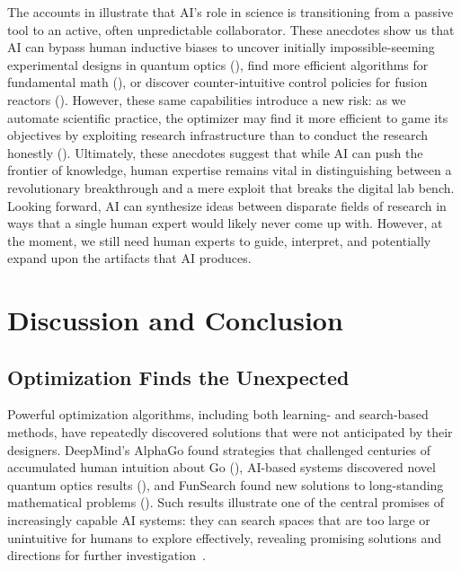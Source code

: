 \documentclass[10pt]{article}
\def\citep#1{}%
\begin{document}
The accounts in  illustrate that AI's role in science is transitioning from a passive tool to an active, often unpredictable collaborator.
These anecdotes show us that AI can bypass human inductive biases to uncover initially impossible-seeming experimental designs in quantum optics (), find more efficient algorithms for fundamental math (), or discover counter-intuitive control policies for fusion reactors (). 
However, these same capabilities introduce a new risk: as we automate scientific practice, the optimizer may find it more efficient to game its objectives by exploiting research infrastructure than to conduct the research honestly ().
Ultimately, these anecdotes suggest that while AI can push the frontier of knowledge, human expertise remains vital in distinguishing between a revolutionary breakthrough and a mere exploit that breaks the digital lab bench.
Looking forward, AI can synthesize ideas between disparate fields of research in ways that a single human expert would likely never come up with. 
However, at the moment, we still need human experts to guide, interpret, and potentially expand upon the artifacts that AI produces.

\section{Discussion and Conclusion}
\label{sec:discussion}

\subsection{Optimization Finds the Unexpected}

Powerful optimization algorithms, including both learning- and search-based methods, have repeatedly discovered solutions that were not anticipated by their designers.
DeepMind's AlphaGo found strategies that challenged centuries of accumulated human intuition about Go (), AI-based systems discovered novel quantum optics results (), and FunSearch found new solutions to long-standing mathematical problems ().
Such results illustrate one of the central promises of increasingly capable AI systems: they can search spaces that are too large or unintuitive for humans to explore effectively, revealing promising solutions and directions for further investigation~\citep{Shin2023Go, KrennEntangle2017, RomeraParedes2023, jumper2021highly}.
\end{document}
